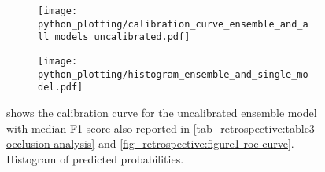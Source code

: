 \begin{figure}
    \begin{subfigure}[c]{0.48\columnwidth}
        \centering
        \texttt{[image: python\_plotting/calibration\_curve\_ensemble\_and\_all\_models\_uncalibrated.pdf]}
    \end{subfigure}
    \begin{subfigure}[c]{0.48\columnwidth}
        \centering
        \texttt{[image: python\_plotting/histogram\_ensemble\_and\_single\_model.pdf]}
    \end{subfigure}
    \caption[Calibration curve for the uncalibrated stroke recognition model and empirical distribution of predicted probabilities.]{  shows the calibration curve for the uncalibrated ensemble model with median F1-score also reported in \cref{tab_retrospective:table3-occlusion-analysis} and \cref{fig_retrospective:figure1-roc-curve}.  Histogram of predicted probabilities.}
\end{figure}







